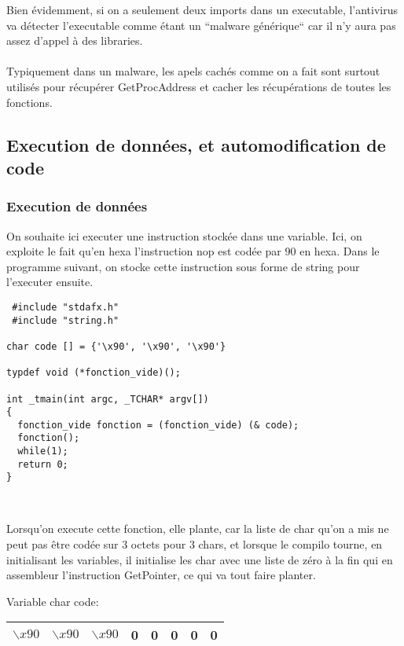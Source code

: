 \documentclass[a4paper,10pt]{article}
\begin{document}
Bien évidemment, si on a seulement deux imports dans un executable, l'antivirus va détecter l'executable comme étant un ``malware générique`` car il n'y aura pas assez d'appel à des libraries.

\paragraph*{}
Typiquement dans un malware, les apels cachés comme on a fait sont surtout utilisés pour récupérer GetProcAddress et cacher les récupérations de toutes les fonctions. 

\subsection{Execution de données, et automodification de code}

\subsubsection{Execution de données}

On souhaite ici executer une instruction stockée dans une variable. Ici, on exploite le fait qu'en hexa l'instruction nop est codée par $90$ en hexa. Dans le programme suivant, on stocke cette instruction sous forme de string pour l'executer ensuite.

\begin{lstlisting}
 #include "stdafx.h"
 #include "string.h"

char code [] = {'\x90', '\x90', '\x90'}

typdef void (*fonction_vide)();

int _tmain(int argc, _TCHAR* argv[])
{
  fonction_vide fonction = (fonction_vide) (& code);
  fonction();
  while(1);
  return 0;
}
  
 
\end{lstlisting}

Lorsqu'on execute cette fonction, elle plante, car la liste de char qu'on a mis ne peut pas être codée sur 3 octets pour 3 chars, et lorsque le compilo tourne, en initialisant les variables, il initialise les char avec une liste de zéro à la fin qui en assembleur l'instruction GetPointer, ce qui va tout faire planter.

Variable char code: \\ \vspace{5mm}

 \begin{center}
\begin{tabular}{ |c|c|c|c|c|c|c|c|}
\hline
 $\backslash x90 $& $\backslash x90 $& $\backslash x90 $& 0 & 0 & 0 & 0 & 0\\ 
\hline
\end{tabular}
\end{center}
\end{document}
